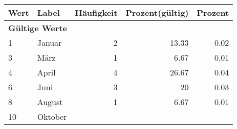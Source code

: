      \begin{longtable}{lXrrr}
     \toprule
     \textbf{Wert} & \textbf{Label} & \textbf{Häufigkeit} & \textbf{Prozent(gültig)} & \textbf{Prozent} \\
     \endhead
     \midrule
     \multicolumn{5}{l}{\textbf{Gültige Werte}}\\

     1 &
     \multicolumn{1}{X}{ Januar   } &


       \num{2} &
       \num[round-mode=places,round-precision=2]{13,33} &
         \num[round-mode=places,round-precision=2]{0,02} \\

     3 &
     \multicolumn{1}{X}{ März   } &


       \num{1} &
       \num[round-mode=places,round-precision=2]{6,67} &
         \num[round-mode=places,round-precision=2]{0,01} \\

     4 &
     \multicolumn{1}{X}{ April   } &


       \num{4} &
       \num[round-mode=places,round-precision=2]{26,67} &
         \num[round-mode=places,round-precision=2]{0,04} \\

     6 &
     \multicolumn{1}{X}{ Juni   } &


       \num{3} &
       \num[round-mode=places,round-precision=2]{20} &
         \num[round-mode=places,round-precision=2]{0,03} \\

     8 &
     \multicolumn{1}{X}{ August   } &


       \num{1} &
       \num[round-mode=places,round-precision=2]{6,67} &
         \num[round-mode=places,round-precision=2]{0,01} \\

     10 &
     \multicolumn{1}{X}{ Oktober   } &



\end{longtable}
